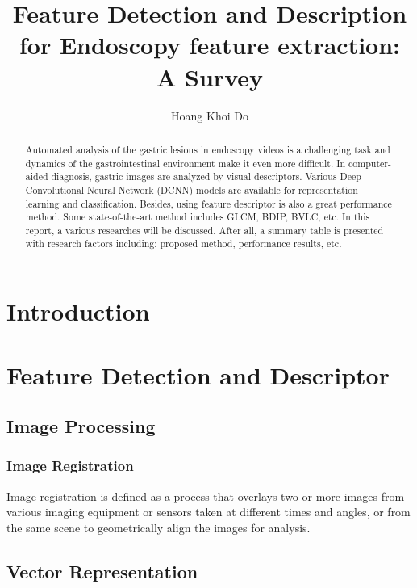 \documentclass{article}
\author[1]{Hoang Khoi Do}
\affil[1]{School of Electrical and Electronics, University of Science and Technology, Hanoi 10000, Vietnam}
\begin{document}
	\title{Feature Detection and Description for Endoscopy feature extraction: A Survey}	
	
	\maketitle
	
	\begin{abstract}
		Automated analysis of the gastric lesions in endoscopy videos is a challenging task and dynamics of the
		gastrointestinal environment make it even more difficult. In computer-aided diagnosis, gastric images are
		analyzed by visual descriptors. Various Deep Convolutional Neural Network (DCNN) models are available for
		representation learning and classification. Besides, using feature descriptor is also a great performance method. Some state-of-the-art method includes GLCM, BDIP, BVLC, etc. In this report, a various researches will be discussed. After all, a summary table is presented with research factors including: proposed method, performance results, etc.
	\end{abstract}
	
	\section{Introduction}
	\section{Feature Detection and Descriptor}
	\subsection{Image Processing}
	\subsubsection{Image Registration}
	\href{https://www.sciencedirect.com/topics/medicine-and-dentistry/image-registration}{Image registration} is defined as a process that overlays two or more images from various imaging equipment or sensors taken at different times and angles, or from the same scene to geometrically align the images for analysis. 
	\subsection{Vector Representation}
\end{document}
